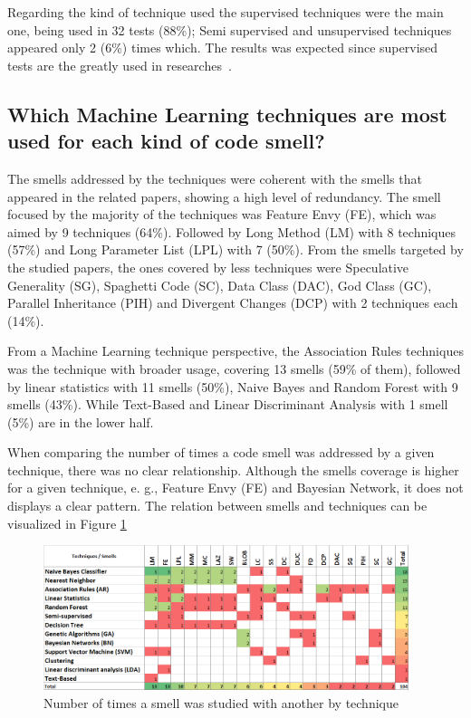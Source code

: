 Regarding the kind of technique used the supervised techniques were the main one, being used in 32 tests (88\%); Semi supervised and unsupervised techniques appeared only 2 (6\%) times which. The results was expected since supervised tests are the greatly used in researches~\citep{kotsiantis2007supervised}.

\subsection{Which Machine Learning techniques are most used for each kind of code smell?}

The smells addressed by the techniques were coherent with the smells that appeared in the related papers, showing a high level of redundancy. The smell focused by the majority of the techniques was Feature Envy (FE), which was aimed by 9 techniques (64\%). Followed by Long Method (LM) with 8 techniques (57\%) and Long Parameter List (LPL) with 7 (50\%). From the smells targeted by the studied papers, the ones covered by less techniques were Speculative Generality (SG), Spaghetti Code (SC), Data Class (DAC),  God Class (GC), Parallel Inheritance (PIH) and Divergent Changes (DCP) with 2 techniques each (14\%).

From a Machine Learning technique perspective, the Association Rules techniques was the technique with broader usage, covering 13 smells (59\% of them), followed by linear statistics with 11 smells (50\%), Naive Bayes and Random Forest with 9 smells (43\%). While Text-Based and Linear Discriminant Analysis with 1 smell (5\%) are in the lower half.


When comparing the number of times a code smell was addressed by a given technique, there was no clear relationship. Although the smells coverage is higher for a given technique, e. g., Feature Envy (FE) and Bayesian Network, it does not displays a clear pattern. The relation between smells and techniques can be visualized in Figure \ref{fig:smellsXMLTechniques}

\begin{figure}[!ht] 
    \centering
	\caption{Number of times a smell was studied with another by technique}
	\label{fig:smellsXMLTechniques}
	\includegraphics[width=0.95\textwidth]{imagens/smellsXMLTechniques.png}
\end{figure}

